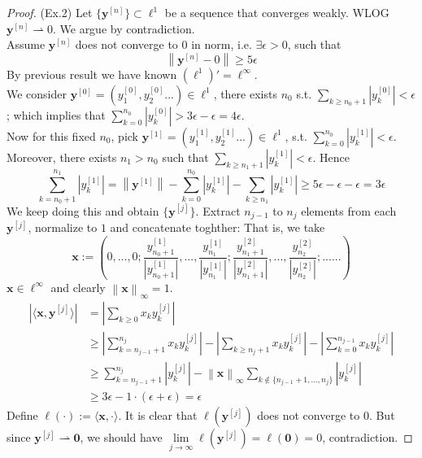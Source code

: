 \documentclass[a4paper, 10pt]{article}
\theoremstyle{definition}
\theoremstyle{hSol}
\begin{document}
\begin{proof} (Ex.2) Let $\{\bm{y}^{[n]}\}\subset \ell^1$ be a sequence that converges weakly. WLOG $\bm{y}^{[n]} \rightharpoonup 0$. We argue by contradiction. \\
Assume $\bm{y}^{[n]}$ does not converge to $0$ in norm, i.e. $\exists \epsilon > 0$, such that 
$$\left\|\bm{y}^{[n]} - 0\right\| \geq 5 \epsilon$$ 
By previous result we have known $(\ell^1)' = \ell^{\infty}$. \\
We consider $\bm{y}^{[0]}=(y^{[0]}_1, y^{[0]}_2...)\in \ell^1$, there exists $n_0$ s.t. $\sum_{k\geq n_0+1}|y_k^{[0]}| <  \epsilon$; which implies that $\sum_{k=0}^{n_0}|y_k^{[0]}| > 3\epsilon - \epsilon = 4 \epsilon$. \\
Now for this fixed $n_0$, pick $\bm{y}^{[1]}=(y^{[1]}_1, y^{[1]}_2...)\in \ell^1$, s.t. $\sum_{k=0}^{n_0}|y_k^{[1]}| <  \epsilon$. Moreover, there exists $n_1>n_0$ such that $\sum_{k\geq n_1+1}|y_k^{[1]}| <  \epsilon$. Hence
$$
\sum_{k=n_0+1}^{n_1}|y_k^{[1]}| = \left\| \bm{y}^{[1]} \right\| - \sum_{k=0}^{n_0}|y_k^{[1]}| - \sum_{k\geq n_1}|y_k^{[1]}| \geq 5 \epsilon - \epsilon - \epsilon = 3\epsilon
$$
We keep doing this and obtain $\{\bm{y}^{[j]}\}$. Extract $n_{j-1}$ to $n_j$ elements from each $\bm{y}^{[j]}$, normalize to $1$ and concatenate toghther: That is, we take 
$$\bm{x}:=\left(0, ..., 0; \frac{y_{n_0+1}^{[1]}}{|y_{n_0+1}^{[1]}|}, ..., \frac{y_{n_1}^{[1]}}{|y_{n_1}^{[1]}|}; \frac{y_{n_1+1}^{[2]}}{|y_{n_1+1}^{[2]}|}, ..., \frac{y_{n_2}^{[2]}}{|y_{n_2}^{[2]}|}; ... ...\right)$$
$\bm{x}\in \ell^{\infty}$ and clearly $\left\|\bm{x}\right\|_{\infty}=1$.
\begin{equation}
  \begin{split}
    |\langle \bm{x}, \bm{y}^{[j]} \rangle| &=  \left|\sum_{k\geq 0} x_k y_k^{[j]}\right|  \\
    &\geq \left|\sum_{k = n_{j-1}+1}^{n_j} x_k y_k^{[j]}\right| - \left|\sum_{k\geq n_j+1} x_k y_k^{[j]}\right| - \left|\sum_{k = 0}^{n_{j-1}} x_k y_k^{[j]}\right| \\
    &\geq \sum_{k = n_{j-1}+1}^{n_j} |y_k^{[j]}| - \left\| \bm{x}\right\|_{\infty}\sum_{k\notin \{n_{j-1}+1, ..., n_j\}} |y_k^{[j]}| \\
    &\geq 3 \epsilon - 1 \cdot (\epsilon + \epsilon) = \epsilon
  \end{split}
\end{equation}
Define $\ell(\cdot):=\langle \bm{x}, \cdot \rangle$. It is clear that $\ell(\bm{y}^{[j]})$ does not converge to 0. But since $\bm{y}^{[j]} \rightharpoonup \bm{0}$, we should have $\lim\limits_{j\rightarrow\infty}\ell(\bm{y}^{[j]})=\ell(\bm{0})=0$, contradiction. 
\end{proof}
\end{document}

